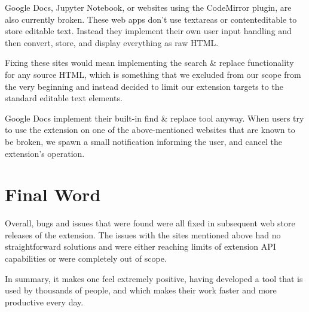 \documentclass[bsc,frontabs,twoside,singlespacing,parskip,deptreport]{infthesis}
\begin{document}
Google Docs, Jupyter Notebook, or websites using the CodeMirror plugin, are also currently broken. These web apps don't use textareas or contenteditable to store editable text. Instead they implement their own user input handling and then convert, store, and display everything as raw HTML.

Fixing these sites would mean implementing the search \& replace functionality for any source HTML, which is something that we excluded from our scope from the very beginning and instead decided to limit our extension targets to the standard editable text elements.

Google Docs implement their built-in find \& replace tool anyway. When users try to use the extension on one of the above-mentioned websites that are known to be broken, we spawn a small notification informing the user, and cancel the extension's operation.

\section{Final Word}
Overall, bugs and issues that were found were all fixed in subsequent web store releases of the extension. The issues with the sites mentioned above had no straightforward solutions and were either reaching limits of extension API capabilities or were completely out of scope.

In summary, it makes one feel extremely positive, having developed a tool that is used by thousands of people, and which makes their work faster and more productive every day.



\end{document}
